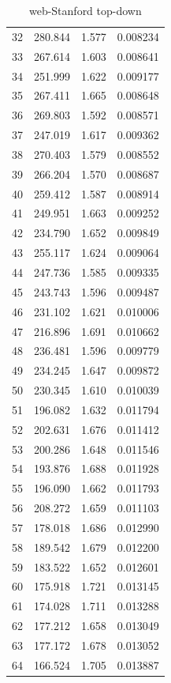 \documentclass[10pt,twocolumn,letterpaper]{article}
\begin{document}
\begin{table}[h]
\begin{tabular}{@{}c|ccc@{}}
32 & 280.844 & 1.577 & 0.008234 \\
33 & 267.614 & 1.603 & 0.008641 \\
34 & 251.999 & 1.622 & 0.009177 \\
35 & 267.411 & 1.665 & 0.008648 \\
36 & 269.803 & 1.592 & 0.008571 \\
37 & 247.019 & 1.617 & 0.009362 \\
38 & 270.403 & 1.579 & 0.008552 \\
39 & 266.204 & 1.570 & 0.008687 \\
40 & 259.412 & 1.587 & 0.008914 \\
41 & 249.951 & 1.663 & 0.009252 \\
42 & 234.790 & 1.652 & 0.009849 \\
43 & 255.117 & 1.624 & 0.009064 \\
44 & 247.736 & 1.585 & 0.009335 \\
45 & 243.743 & 1.596 & 0.009487 \\
46 & 231.102 & 1.621 & 0.010006 \\
47 & 216.896 & 1.691 & 0.010662 \\
48 & 236.481 & 1.596 & 0.009779 \\
49 & 234.245 & 1.647 & 0.009872 \\
50 & 230.345 & 1.610 & 0.010039 \\
51 & 196.082 & 1.632 & 0.011794 \\
52 & 202.631 & 1.676 & 0.011412 \\
53 & 200.286 & 1.648 & 0.011546 \\
54 & 193.876 & 1.688 & 0.011928 \\
55 & 196.090 & 1.662 & 0.011793 \\
56 & 208.272 & 1.659 & 0.011103 \\
57 & 178.018 & 1.686 & 0.012990 \\
58 & 189.542 & 1.679 & 0.012200 \\
59 & 183.522 & 1.652 & 0.012601 \\
60 & 175.918 & 1.721 & 0.013145 \\
61 & 174.028 & 1.711 & 0.013288 \\
62 & 177.212 & 1.658 & 0.013049 \\
63 & 177.172 & 1.678 & 0.013052 \\
64 & 166.524 & 1.705 & 0.013887 \\
\bottomrule
\end{tabular}
\caption{web-Stanford top-down}
\end{table}
\end{document}
